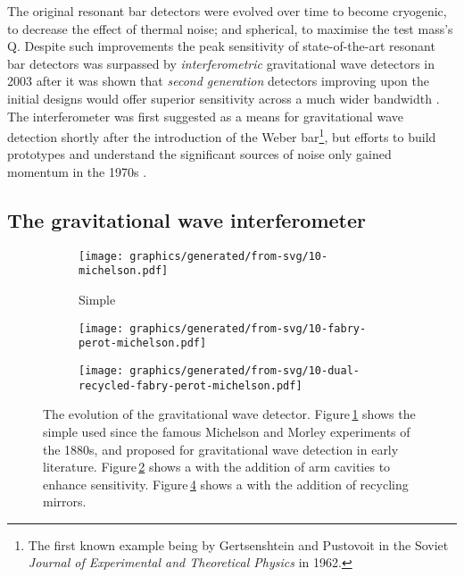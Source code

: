 The original resonant bar detectors were evolved over time to become cryogenic, to decrease the effect of thermal noise; and spherical, to maximise the test mass's Q. Despite such improvements the peak sensitivity of state-of-the-art resonant bar detectors was surpassed by \emph{interferometric} gravitational wave detectors in 2003 \cite{Pitkin2011} after it was shown that \emph{second generation} detectors improving upon the initial designs would offer superior sensitivity across a much wider bandwidth \cite{Harry2002a}. The interferometer was first suggested as a means for gravitational wave detection shortly after the introduction of the Weber bar\footnote{The first known example being by Gertsenshtein and Pustovoit in the Soviet \emph{Journal of Experimental and Theoretical Physics} in 1962.}, but efforts to build prototypes and understand the significant sources of noise only gained momentum in the 1970s \cite{Moss1971, Weiss1972}.

\subsection{\label{sec:gw-interferometry}The gravitational wave interferometer}

\begin{figure}
  \begin{center}
    \begin{subfigure}{.3\textwidth}
      \texttt{[image: graphics/generated/from-svg/10-michelson.pdf]}
      \caption{Simple \MI{}}
      \label{fig:mi}
    \end{subfigure}
    \hfill
    \begin{subfigure}{.3\textwidth}
      \texttt{[image: graphics/generated/from-svg/10-fabry-perot-michelson.pdf]}
      \caption{\FPMI{}}
      \label{fig:fpmi}
    \end{subfigure}
    \hfill
    \begin{subfigure}{.3\textwidth}
      \texttt{[image: graphics/generated/from-svg/10-dual-recycled-fabry-perot-michelson.pdf]}
      \caption{\DRFPMI{}}
      \label{fig:drfpmi}
    \end{subfigure}
    \caption[The evolution of the gravitational wave detector]{The evolution of the gravitational wave detector. Figure\,\ref{fig:mi} shows the simple \MI{} used since the famous Michelson and Morley experiments of the 1880s, and proposed for gravitational wave detection in early literature. Figure\,\ref{fig:fpmi} shows a \MI{} with the addition of \FP{} arm cavities to enhance sensitivity. Figure\,\ref{fig:drfpmi} shows a \FPMI{} with the addition of recycling mirrors.}
  \end{center}
\end{figure}

